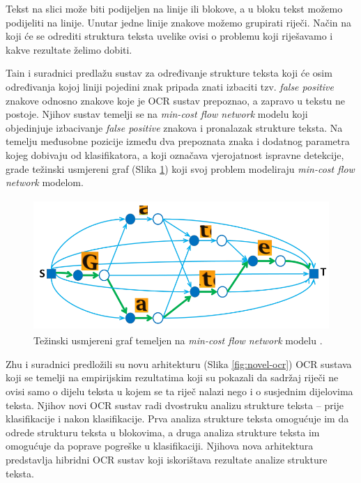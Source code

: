 \documentclass[times, utf8, zavrsni]{fer}
\begin{document}
Tekst na slici može biti podijeljen na linije ili blokove, a u bloku
tekst možemo podijeliti na linije. Unutar jedne linije znakove možemo grupirati riječi. Način na
koji će se odrediti struktura teksta uvelike ovisi o problemu koji riješavamo i kakve rezultate
želimo dobiti.

Tain i suradnici \citep{DBLP:journals/corr/TianPHLYT16} predlažu sustav za određivanje strukture teksta
koji će osim određivanja kojoj liniji pojedini znak pripada znati izbaciti tzv. \emph{false positive}
znakove odnosno znakove koje je OCR sustav prepoznao, a zapravo u tekstu ne postoje. Njihov sustav temelji
se na \emph{min-cost flow network} modelu koji objedinjuje izbacivanje \emph{false positive} znakova i
pronalazak strukture teksta. Na temelju međusobne pozicije između dva prepoznata znaka i
dodatnog parametra kojeg dobivaju od klasifikatora, a koji označava vjerojatnost ispravne detekcije, grade težinski
usmjereni graf (Slika \ref{fig:text-flow}) koji svoj problem modeliraju \emph{min-cost flow network} modelom.

\begin{figure}[htb]
    \centering
    \includegraphics[height=5cm]{images/text-flow.png}
    \caption{Težinski usmjereni graf temeljen na \emph{min-cost flow network} modelu \citep{DBLP:journals/corr/TianPHLYT16}.}
    \label{fig:text-flow}
\end{figure}

\pagebreak

Zhu i suradnici \citep{zhu2016novel} predložili su novu arhitekturu (Slika \ref{fig:novel-ocr}) OCR sustava koji se temelji na empirijskim
rezultatima koji su pokazali da sadržaj riječi ne ovisi samo o dijelu teksta u kojem se ta riječ
nalazi nego i o susjednim dijelovima teksta. Njihov novi OCR sustav radi dvostruku analizu strukture
teksta -- prije klasifikacije i nakon klasifikacije. Prva analiza strukture teksta omogućuje im da odrede
strukturu teksta u blokovima, a druga analiza strukture teksta im omogućuje da poprave pogreške u klasifikaciji.
Njihova nova arhitektura predstavlja hibridni OCR sustav koji iskorištava rezultate analize strukture teksta.
\end{document}
